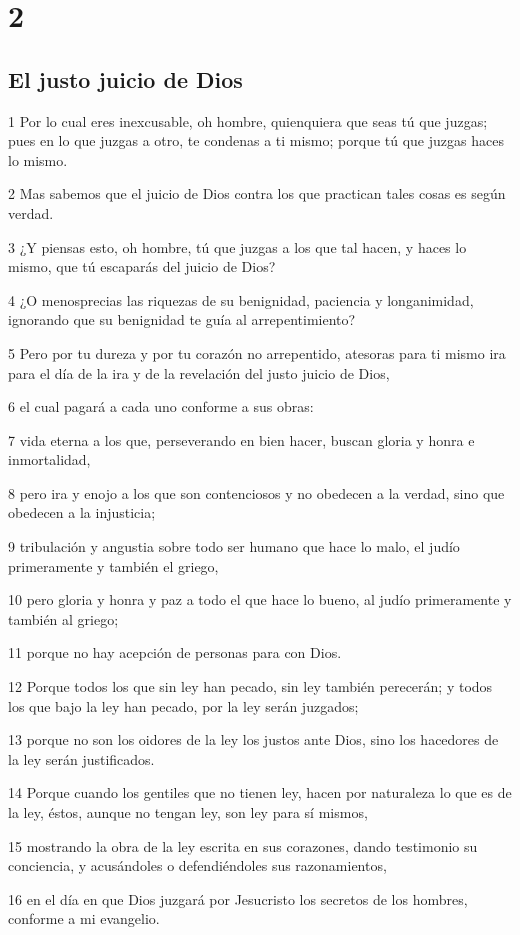 \chapter{2}

\section*{El justo juicio de Dios}

\par 1 Por lo cual eres inexcusable, oh hombre, quienquiera que seas tú que juzgas; pues en lo que juzgas a otro, te condenas a ti mismo; porque tú que juzgas haces lo mismo.
\par 2 Mas sabemos que el juicio de Dios contra los que practican tales cosas es según verdad.
\par 3 ¿Y piensas esto, oh hombre, tú que juzgas a los que tal hacen, y haces lo mismo, que tú escaparás del juicio de Dios?
\par 4 ¿O menosprecias las riquezas de su benignidad, paciencia y longanimidad, ignorando que su benignidad te guía al arrepentimiento?
\par 5 Pero por tu dureza y por tu corazón no arrepentido, atesoras para ti mismo ira para el día de la ira y de la revelación del justo juicio de Dios,
\par 6 el cual pagará a cada uno conforme a sus obras:
\par 7 vida eterna a los que, perseverando en bien hacer, buscan gloria y honra e inmortalidad,
\par 8 pero ira y enojo a los que son contenciosos y no obedecen a la verdad, sino que obedecen a la injusticia;
\par 9 tribulación y angustia sobre todo ser humano que hace lo malo, el judío primeramente y también el griego,
\par 10 pero gloria y honra y paz a todo el que hace lo bueno, al judío primeramente y también al griego;
\par 11 porque no hay acepción de personas para con Dios.
\par 12 Porque todos los que sin ley han pecado, sin ley también perecerán; y todos los que bajo la ley han pecado, por la ley serán juzgados;
\par 13 porque no son los oidores de la ley los justos ante Dios, sino los hacedores de la ley serán justificados.
\par 14 Porque cuando los gentiles que no tienen ley, hacen por naturaleza lo que es de la ley, éstos, aunque no tengan ley, son ley para sí mismos,
\par 15 mostrando la obra de la ley escrita en sus corazones, dando testimonio su conciencia, y acusándoles o defendiéndoles sus razonamientos,
\par 16 en el día en que Dios juzgará por Jesucristo los secretos de los hombres, conforme a mi evangelio.

